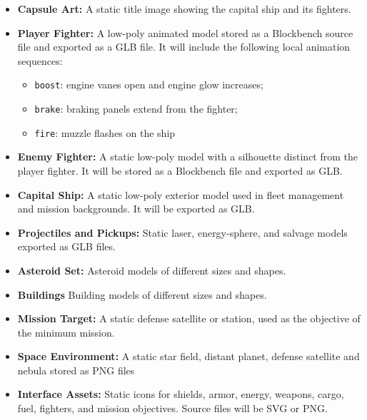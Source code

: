 \documentclass[journal]{IEEEtran}
\begin{document}
\begin{itemize}

    \item \textbf{Capsule Art:}
    A static title image showing the capital ship and its fighters.

    \item \textbf{Player Fighter:}
    A low-poly animated model stored as a Blockbench source file and exported as a GLB file. It will include the following local animation sequences:
    \begin{itemize}
        \item \texttt{boost}: engine vanes open and engine glow increases;
        \item \texttt{brake}: braking panels extend from the fighter;
        \item \texttt{fire}: muzzle flashes on the ship
    \end{itemize}

    \item \textbf{Enemy Fighter:}
    A static low-poly model with a silhouette distinct from the player fighter. It will be stored as a Blockbench file and exported as GLB.

    \item \textbf{Capital Ship:}
    A static low-poly exterior model used in fleet management and mission backgrounds. It will be exported as GLB.

    \item \textbf{Projectiles and Pickups:}
    Static laser, energy-sphere, and salvage models exported as GLB files.

    \item \textbf{Asteroid Set:}
    Asteroid models of different sizes and shapes.

    \item \textbf{Buildings}
    Building models of different sizes and shapes.

    \item \textbf{Mission Target:}
    A static defense satellite or station,  used as the objective of the minimum mission.

    \item \textbf{Space Environment:}
    A static star field, distant planet, defense satellite and nebula stored as PNG files

    \item \textbf{Interface Assets:}
    Static icons for shields, armor, energy, weapons, cargo, fuel, fighters, and mission objectives. Source files will be SVG or PNG.

\end{itemize}
\end{document}
